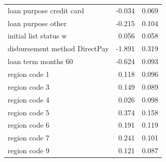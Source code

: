 \begin{tabular}{lrr}
loan purpose credit card & -0.034 & 0.069 \\
loan purpose other & -0.215 & 0.104 \\
initial list status w & 0.056 & 0.058 \\
disbursement method DirectPay & -1.891 & 0.319 \\
loan term months 60 & -0.624 & 0.093 \\
region code 1 & 0.118 & 0.096 \\
region code 3 & 0.149 & 0.089 \\
region code 4 & 0.026 & 0.098 \\
region code 5 & 0.374 & 0.158 \\
region code 6 & 0.191 & 0.119 \\
region code 7 & 0.241 & 0.101 \\
region code 9 & 0.121 & 0.087 \\
\bottomrule
\end{tabular}
